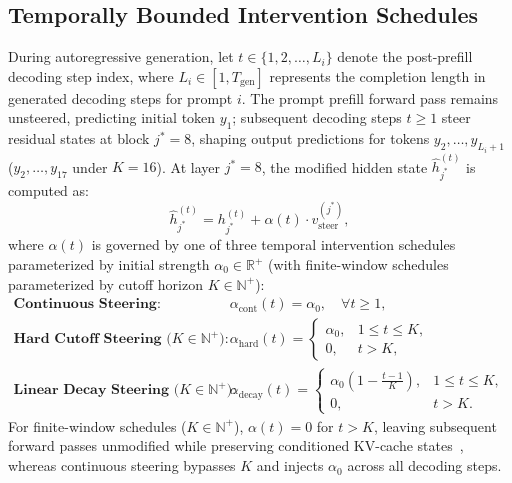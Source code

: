 \documentclass[runningheads]{llncs}
\begin{document}
\subsection{Temporally Bounded Intervention Schedules}
During autoregressive generation, let $t \in \{1, 2, \dots, L_i\}$ denote the post-prefill decoding step index, where $L_i \in [1, T_{\text{gen}}]$ represents the completion length in generated decoding steps for prompt $i$. The prompt prefill forward pass remains unsteered, predicting initial token $y_1$; subsequent decoding steps $t \ge 1$ steer residual states at block $j^*=8$, shaping output predictions for tokens $y_2, \dots, y_{L_i+1}$ ($y_2, \dots, y_{17}$ under $K=16$). At layer $j^*=8$, the modified hidden state $\hat{h}_{j^*}^{(t)}$ is computed as:
\begin{equation}
\hat{h}_{j^*}^{(t)} = h_{j^*}^{(t)} + \alpha(t) \cdot v_{\text{steer}}^{(j^*)},
\end{equation}
where $\alpha(t)$ is governed by one of three temporal intervention schedules parameterized by initial strength $\alpha_0 \in \mathbb{R}^+$ (with finite-window schedules parameterized by cutoff horizon $K \in \mathbb{N}^+$):
\begin{align}
\textbf{Continuous Steering:} \quad &\alpha_{\text{cont}}(t) = \alpha_0, \quad \forall t \ge 1, \\
\textbf{Hard Cutoff Steering ($K \in \mathbb{N}^+$):} \quad &\alpha_{\text{hard}}(t) = \begin{cases} \alpha_0, & 1 \le t \le K, \\ 0, & t > K, \end{cases} \\
\textbf{Linear Decay Steering ($K \in \mathbb{N}^+$):} \quad &\alpha_{\text{decay}}(t) = \begin{cases} \alpha_0 \left(1 - \frac{t-1}{K}\right), & 1 \le t \le K, \\ 0, & t > K. \end{cases}
\end{align}
For finite-window schedules ($K \in \mathbb{N}^+$), $\alpha(t) = 0$ for $t > K$, leaving subsequent forward passes unmodified while preserving conditioned KV-cache states~\cite{ref_vllm}, whereas continuous steering bypasses $K$ and injects $\alpha_0$ across all decoding steps.
\end{document}
